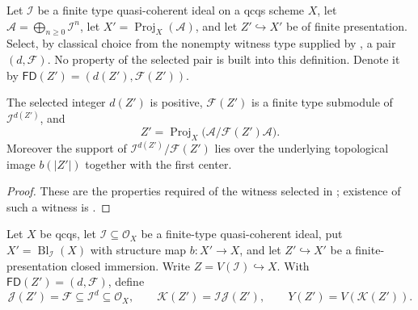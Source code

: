 \begin{definition}
  \label{def:nagata-proj-closed-center-finite-degree}

  Let $\mathcal I$ be a finite type quasi-coherent ideal on a qcqs scheme
  $X$, let $\mathcal A=\bigoplus_{n\geq0}\mathcal I^n$, let
  $X'=\operatorname{Proj}_X(\mathcal A)$, and let
  $Z'\hookrightarrow X'$ be of finite presentation.  Select, by classical
  choice from the nonempty witness type supplied by
  , a pair
  $(d,\mathcal F)$.  No property of the selected pair is built into this
  definition.  Denote it by
  $\mathsf{FD}(Z')=(d(Z'),\mathcal F(Z'))$.
\end{definition}

\begin{lemma}
  \label{lemma:nagata-proj-closed-center-finite-degree}

  The selected integer $d(Z')$ is positive, $\mathcal F(Z')$ is a finite
  type submodule of $\mathcal I^{d(Z')}$, and
  \[
    Z'=\operatorname{Proj}_X
      \bigl(\mathcal A/\mathcal F(Z')\mathcal A\bigr).
  \]
  Moreover the support of
  $\mathcal I^{d(Z')}/\mathcal F(Z')$ lies over the underlying topological
  image $b(|Z'|)$ together with the first center.
\end{lemma}

\begin{proof}
  These are the properties required of the witness selected in
  ; existence of such a
  witness is
  .
\end{proof}

\begin{definition}
  \label{def:nagata-composition-center-ideal}

  Let $X$ be qcqs, let $\mathcal I\subseteq\mathcal O_X$ be a finite-type
  quasi-coherent ideal, put
  $X'=\operatorname{Bl}_{\mathcal I}(X)$ with structure map
  $b\colon X'\to X$, and let $Z'\hookrightarrow X'$ be a
  finite-presentation closed immersion.  Write
  $Z=V(\mathcal I)\hookrightarrow X$.  With
  $\mathsf{FD}(Z')=(d,\mathcal F)$, define
  \[
    \mathcal J(Z')=\mathcal F\subseteq\mathcal I^d\subseteq\mathcal O_X,
    \qquad
    \mathcal K(Z')=\mathcal I\mathcal J(Z'),
    \qquad
    Y(Z')=V(\mathcal K(Z')).
  \]
\end{definition}

